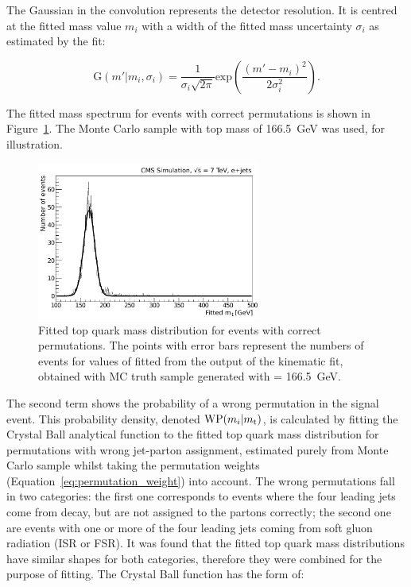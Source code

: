 The Gaussian in the convolution represents the detector resolution. It is centred at the fitted mass value $m_{i}$ with
a width of the fitted mass uncertainty $\sigma_{i}$ as estimated by the fit:

\begin{equation}
\textrm{G}(m'|m_{i},\sigma_{i}) = \frac{1}{\sigma_{i}\sqrt{2\pi}}
\textrm{exp}\left(\frac{(m'-m_{i})^{2}}{2\sigma_{i}^2}\right).
\end{equation}

The fitted mass spectrum for \ttbar events with correct permutations is shown in
Figure~\ref{fig:fitted_ttbar_cp_density}. The Monte Carlo sample with top mass of \SI{166.5}{\GeV} was used, for
illustration.

\begin{figure}[!htpb]
	\centering
    \includegraphics[width=0.65\textwidth]{correct_permutations_fitted_top_mass}
	\caption[Fitted top quark mass distribution for \ttbar events with correct permutations]{Fitted top quark mass
	distribution for \ttbar events with correct permutations. The points with error bars represent the numbers of events
	for values of fitted \mtop from the output of the kinematic fit, obtained with MC truth sample generated with \mtop
	= \SI{166.5}{\GeV}.}
	\label{fig:fitted_ttbar_cp_density}
\end{figure}

The second term shows the probability of a wrong permutation in the signal event. This probability density, denoted
$\textrm{WP}(m_i|m_\mathrm{t})$, is calculated by fitting the Crystal Ball analytical function to the fitted top quark mass
distribution for permutations with wrong jet-parton assignment, estimated purely from Monte Carlo \ttbar sample whilst
taking the permutation weights (Equation~\ref{eq:permutation_weight}) into account. The wrong permutations fall in two
categories: the first one corresponds to events where the four leading jets come from \ttbar decay, but are not assigned
to the partons correctly; the second one are events with one or more of the four leading jets coming from soft gluon
radiation (ISR or FSR). It was found that the fitted top quark mass distributions have similar shapes for both
categories, therefore they were combined for the purpose of fitting. The Crystal Ball function \autocite{CB1, CB2} has
the form of:

